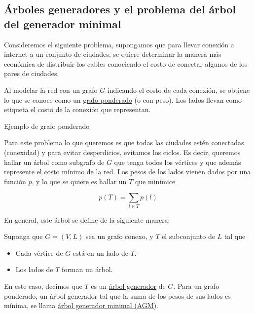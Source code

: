 \subsection{Árboles generadores y el problema del árbol del generador minimal}

Consideremos el siguiente problema, supongamos que para llevar conexión a internet a un conjunto de ciudades, se quiere determinar la manera más económica de distribuir los cables conociendo el costo de conectar algunos de los pares de ciudades.

\begin{defn}
    Al modelar la red con un grafo $G$ indicando el costo de cada conexión, se obtiene lo que se conoce como un \ul{grafo ponderado} (o con peso). Los lados llevan como etiqueta el costo de la conexión que representan.
\end{defn}

\begin{marginfigure}
    \centering
    \label{fig:ponderado}
    \caption{Ejemplo de grafo ponderado}
\end{marginfigure}

Para este problema lo que queremos es que todas las ciudades estén conectadas (conexidad) y para evitar desperdicios, evitamos los ciclos. Es decir, queremos hallar un árbol como subgrafo de $G$ que tenga todos los vértices y que además represente el costo mínimo de la red. Los pesos de los lados vienen dados por una función $p$, y lo que se quiere es hallar un $T$ que minimice

\[
p(T) = \sum_{l \in T} p(l)
\]

En general, este árbol se define de la siguiente manera:

\begin{defn}
    Suponga que $G = (V, L)$ sea un grafo conexo, y $T$ el subconjunto de $L$ tal que
    
    \begin{itemize}
        \item Cada vértice de $G$ está en un lado de $T$.
        \item Los lados de $T$ forman un árbol.
    \end{itemize}
    
    En este caso, decimos que $T$ es un \ul{árbol generador} de $G$. Para un grafo ponderado, un árbol generador tal que la suma de los pesos de sus lados es mínima, se llama \ul{árbol generador minimal (AGM)}.
\end{defn}

